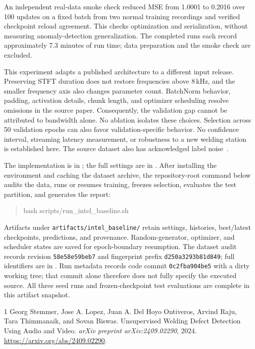\documentclass[10pt,letterpaper]{article}
\makeatletter
\renewcommand\section{\@startsection{section}{1}{\z@}{-2.0ex plus -.5ex}{.8ex}{\large\bfseries}}
\makeatother
\begin{document}
An independent real-data smoke check reduced MSE from 1.0001 to 0.2016 over
100 updates on a fixed batch from two normal training recordings and verified
checkpoint reload agreement. This checks optimization and serialization,
without measuring anomaly-detection generalization. The completed runs each
record approximately 7.3 minutes of run time; data preparation and the smoke
check are excluded.

\section{Limitations and reproducibility}
This experiment adapts a published architecture to a different input release.
Preserving STFT duration does not restore frequencies above 8\,kHz, and the
smaller frequency axis also changes parameter count. BatchNorm behavior,
padding, activation details, chunk length, and optimizer scheduling resolve
omissions in the source paper. Consequently, the validation gap cannot be
attributed to bandwidth alone. No ablation isolates these choices. Selection across
50 validation epochs can also favor validation-specific behavior. No confidence
interval, streaming latency measurement, or robustness
to a new welding station is established here. The source dataset also has
acknowledged label noise~\cite{stemmer2024}.

The implementation is in ; the full settings are in
. After installing the environment and caching
the dataset archive, the repository-root command below audits the data, runs
or resumes training, freezes selection, evaluates the test partition, and
generates the report:
\begin{quote}\small\ttfamily bash scripts/run\_intel\_baseline.sh\end{quote}
Artifacts under \texttt{artifacts/intel\_baseline/} retain settings, histories,
best/latest checkpoints, predictions, and provenance. Random-generator,
optimizer, and scheduler states are saved for epoch-boundary resumption.
The dataset audit records revision \texttt{58e58e59beb7} and fingerprint prefix
\texttt{d250a3293b81d849}; full identifiers are in .
Run metadata records code commit \texttt{0c2fba904be5} with a dirty working tree;
that commit alone therefore does not fully specify the executed source.
All three seed runs and frozen-checkpoint test evaluations are complete in this
artifact snapshot.

\begin{thebibliography}{1}
\small
{}
Georg Stemmer, Jose A. Lopez, Juan A. Del Hoyo Ontiveros, Arvind Raju,
Tara Thimmanaik, and Sovan Biswas.
\newblock Unsupervised Welding Defect Detection Using Audio and Video.
\newblock \emph{arXiv preprint arXiv:2409.02290}, 2024.
\newblock \url{https://arxiv.org/abs/2409.02290}.
\end{thebibliography}
\end{document}
